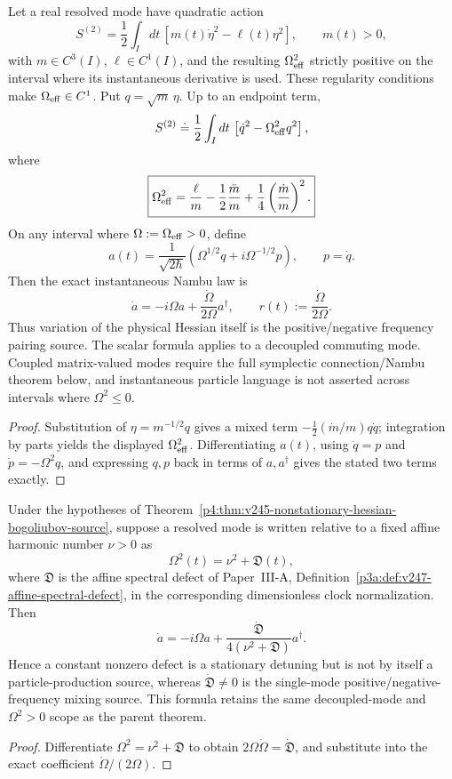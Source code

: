 \documentclass[12pt,a4paper]{article}
\begin{document}
\begin{theorem}
\label{p4:thm:v245-nonstationary-hessian-bogoliubov-source}
Let a real resolved mode have quadratic action
\[
 S^{(2)}=\frac12\int_I dt\,
 \left[m(t)\dot\eta^2-\ell(t)\eta^2\right],
 \qquad m(t)>0,
\]
with \(m\in C^3(I)\), \(\ell\in C^1(I)\), and the
resulting \(\Omega_{\rm eff}^2\) strictly positive on the interval
where its instantaneous derivative is used. These regularity conditions
make \(\Omega_{\rm eff}\in C^1\). Put \(q=\sqrt m\,\eta\).  Up to
an endpoint term,
\[
 S^{(2)}\doteq\frac12\int_I dt\,
 \left[\dot q^2-\Omega_{\rm eff}^2q^2\right],
\]
where
\[
 \boxed{
 \Omega_{\rm eff}^2
 =\frac{\ell}{m}
 -\frac12\frac{\ddot m}{m}
 +\frac14\left(\frac{\dot m}{m}\right)^2.}
\]
On any interval where \(\Omega:=\Omega_{\rm eff}>0\), define
\[
 a(t)=\frac1{\sqrt{2\hbar}}
 \left(\Omega^{1/2}q+i\Omega^{-1/2}p\right),
 \qquad p=\dot q.
\]
Then the exact instantaneous Nambu law is
\[
 \boxed{\dot a=-i\Omega a+\frac{\dot\Omega}{2\Omega}a^\dagger,}
 \qquad
 \boxed{r(t):=\frac{\dot\Omega}{2\Omega}.}
\]
Thus variation of the physical Hessian itself is the positive/negative
frequency pairing source.  The scalar formula applies to a decoupled
commuting mode.  Coupled matrix-valued modes require the full symplectic
connection/Nambu theorem below, and instantaneous particle language is not
asserted across intervals where \(\Omega^2\le0\).
\end{theorem}

\begin{proof}
Substitution of \(\eta=m^{-1/2}q\) gives a mixed term
\(-\tfrac12(\dot m/m)q\dot q\); integration by parts yields the displayed
\(\Omega_{\rm eff}^2\).  Differentiating \(a(t)\), using
\(\dot q=p\) and \(\dot p=-\Omega^2q\), and expressing \(q,p\) back in
terms of \(a,a^\dagger\) gives the stated two terms exactly.
\end{proof}



\begin{corollary}
\label{p4:cor:v247-defect-bogoliubov-source}
Under the hypotheses of
Theorem~\ref{p4:thm:v245-nonstationary-hessian-bogoliubov-source}, suppose a
resolved mode is written relative to a fixed affine harmonic number \(\nu>0\)
as
\[
 \Omega^2(t)=\nu^2+\mathfrak D(t),
\]
where \(\mathfrak D\) is the affine spectral defect of
Paper~III-A, Definition~\ref{p3a:def:v247-affine-spectral-defect}, in the
corresponding dimensionless clock normalization.  Then
\[
 \boxed{\dot a=-i\Omega a
 +\frac{\dot{\mathfrak D}}{4(\nu^2+\mathfrak D)}a^\dagger.}
\]
Hence a constant nonzero defect is a stationary detuning but is not by itself
a particle-production source, whereas \(\dot{\mathfrak D}\ne0\) is the
single-mode positive/negative-frequency mixing source.  This formula retains
the same decoupled-mode and \(\Omega^2>0\) scope as the parent theorem.
\end{corollary}
\begin{proof}
Differentiate \(\Omega^2=\nu^2+\mathfrak D\) to obtain
\(2\Omega\dot\Omega=\dot{\mathfrak D}\), and substitute into the exact
coefficient \(\dot\Omega/(2\Omega)\).
\end{proof}
\end{document}
